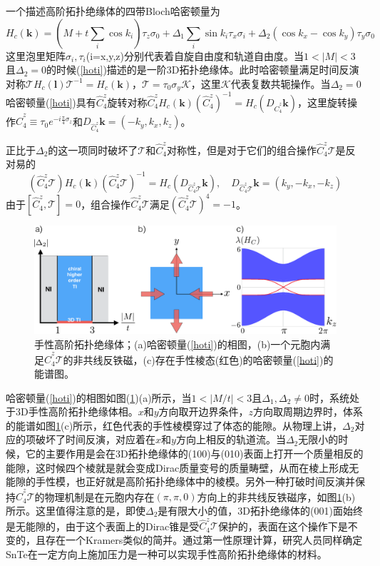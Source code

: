  一个描述高阶拓扑绝缘体的四带Bloch哈密顿量为
\begin{equation}
H_c(\mathbf{k})=(M+t\sum_i\cos k_i)\tau_z\sigma_0+\Delta_1\sum_i\sin k_i\tau_x\sigma_i+\Delta_2(\cos k_x-\cos k_y)\tau_y\sigma_0\label{hoti}
\end{equation}
这里泡里矩阵$\sigma_i,\tau_i$(i=x,y,z)分别代表着自旋自由度和轨道自由度。当$1<|M|<3$且$\Delta_2=0$的时候(\ref{hoti})描述的是一阶3D拓扑绝缘体。此时哈密顿量满足时间反演对称$\mathcal{T}H_c(\mathbf{l})\mathcal{T}^{-1}=H_c(\mathbf{k})$，$\mathcal{T}=\tau_0\sigma_y\mathcal{K}$，这里$\mathcal{K}$代表复数共轭操作。当$\Delta_2=0$哈密顿量(\ref{hoti})具有$\hat{C}_4^z$旋转对称$\hat{C}_4^zH_c(\mathbf{k})(\hat{C}_4^z)^{-1}=H_c(D_{\hat{C}_4^z}\mathbf{k})$，这里旋转操作$\hat{C}_4^z\equiv \tau_0e^{-i\frac{\pi}{4}\sigma_z}$和$D_{\hat{C}_4^z}\mathbf{k}=(-k_y,k_x,k_z)$。

 正比于$\Delta_2$的这一项同时破坏了$\mathcal{T}$和$\hat{C}_4^z$对称性，但是对于它们的组合操作$\hat{C}_4^z\mathcal{T}$是反对易的
\begin{equation}
(\hat{C}_4^z\mathcal{T})H_c(\mathbf{k})(\hat{C}_4^z\mathcal{T})^{-1}=H_c(D_{\hat{C}_4^z\mathcal{T}}\mathbf{k}),\quad D_{\hat{C}_4^z\mathcal{T}}\mathbf{k}=(k_y,-k_x,-k_z)
\end{equation}
由于$\left[\hat{C}_4^z,\mathcal{T}\right]=0$，组合操作$\hat{C}_4^z\mathcal{T}$满足$(\hat{C}_4^z\mathcal{T})^4=-1$。
\begin{figure}[h]
\centering
\includegraphics[scale=0.7]{pic/fig7}
\caption{手性高阶拓扑绝缘体；(a)哈密顿量(\ref{hoti})的相图，(b)一个元胞内满足$\hat{C}_4^z\mathcal{T}$的非共线反铁磁，(c)存在手性棱态(红色)的哈密顿量(\ref{hoti})的能谱图\cite{re23}。}\label{fig7}
\end{figure}
哈密顿量(\ref{hoti})的相图如图(\ref{fig7})(a)所示，当$1<|M/t|<3$且$\Delta_1,\Delta_2\neq 0$时，系统处于3D手性高阶拓扑绝缘体相。$x$和$y$方向取开边界条件，$z$方向取周期边界时，体系的能谱如图\ref{fig7}(c)所示，红色代表的手性棱模穿过了体态的能隙。从物理上讲，$\Delta_2$对应的项破坏了时间反演，对应着在$x$和$y$方向上相反的轨道流。当$\Delta_2$无限小的时候，它的主要作用是会在3D拓扑绝缘体的(100)与(010)表面上打开一个质量相反的能隙，这时候四个棱就是就会变成Dirac质量变号的质量畴壁，从而在棱上形成无能隙的手性模，也正好就是高阶拓扑绝缘体中的棱模。另外一种打破时间反演并保持$\hat{C}_4^z\mathcal{T}$的物理机制是在元胞内存在$(\pi,\pi,0)$方向上的非共线反铁磁序，如图\ref{fig7}(b)所示。这里值得注意的是，即使$\Delta_2$是有限大小的值，3D拓扑绝缘体的(001)面始终是无能隙的，由于这个表面上的Dirac锥是受$\hat{C}_4^z\mathcal{T}$保护的，表面在这个操作下是不变的，且存在一个Kramers类似的简并。通过第一性原理计算，研究人员同样确定SnTe在一定方向上施加压力是一种可以实现手性高阶拓扑绝缘体的材料\cite{re23}。
